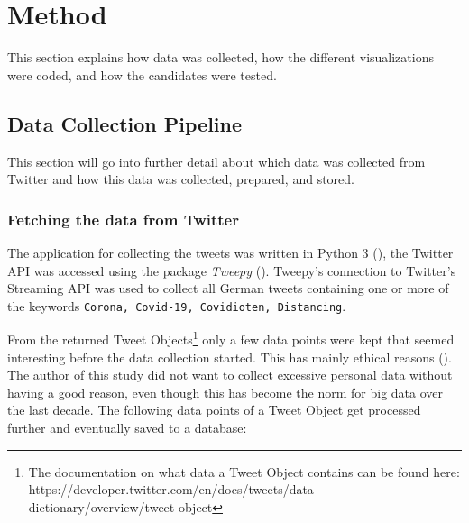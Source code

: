 \section{Method}
This section explains how data was collected, how the different visualizations were coded, and how the candidates were tested.

\subsection{Data Collection Pipeline}
This section will go into further detail about which data was collected from Twitter and how this data was collected, prepared, and stored.

\subsubsection{Fetching the data from Twitter} \label{sec:fetchedData}
The application for collecting the tweets was written in Python 3 (\cite{10.5555/1593511}), the Twitter API was accessed using the package \emph{Tweepy} (\cite{roesslein2020tweepy}). Tweepy's connection to Twitter's Streaming API was used to collect all German tweets containing one or more of the keywords \verb+Corona, Covid-19, Covidioten, Distancing+.

From the returned Tweet Objects\footnote{The documentation on what data a Tweet Object contains can be found here: https://developer.twitter.com/en/docs/tweets/data-dictionary/overview/tweet-object} only a few data points were kept that seemed interesting before the data collection started. This has mainly ethical reasons (\cite{richards2014big}). The author of this study did not want to collect excessive personal data without having a good reason, even though this has become the norm for big data over the last decade. The following data points of a Tweet Object get processed further and eventually saved to a database:

